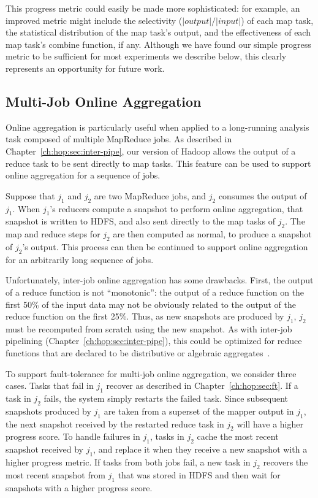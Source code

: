 This progress metric could easily be made more sophisticated: for example, an
improved metric might include the selectivity ($|output|/|input|$) of each map task, the
statistical distribution of the map task's output, and the effectiveness of each
map task's combine function, if any. 
Although we have found our simple progress metric to be
sufficient for most experiments we describe below, this clearly
represents an opportunity for future work.

\subsection{Multi-Job Online Aggregation}
\label{ch:hop:sec:online-multi}

Online aggregation is particularly useful when applied to a long-running
analysis task composed of multiple MapReduce jobs.  As described in
Chapter~\ref{ch:hop:sec:inter-pipe}, our version of Hadoop allows the output of
a reduce task to be sent directly to map tasks.  This feature can be used to
support online aggregation for a sequence of jobs.

Suppose that $j_1$ and $j_2$ are two MapReduce jobs, and $j_2$ consumes the
output of $j_1$.  When $j_1$'s reducers compute a snapshot to perform online
aggregation, that snapshot is written to HDFS, and also sent directly to the
map tasks of $j_2$.  The map and reduce steps for $j_2$ are then computed as
normal, to produce a snapshot of $j_2$'s output.  This process can then be
continued to support online aggregation for an arbitrarily long sequence of
jobs.
  
Unfortunately, inter-job online aggregation has some drawbacks.  First, the
output of a reduce function is not ``monotonic'': the output of a reduce
function on the first 50\% of the input data may not be obviously related to
the output of the reduce function on the first 25\%.  Thus, as new snapshots
are produced by $j_1$, $j_2$ must be recomputed from scratch using the new
snapshot.  As with inter-job pipelining (Chapter~\ref{ch:hop:sec:inter-pipe}),
this could be optimized for reduce functions that are declared to be
distributive or algebraic aggregates~\cite{datacube}.

To support fault-tolerance for multi-job online aggregation, we consider three
cases. Tasks that fail in $j_1$ recover as described in Chapter~\ref{ch:hop:sec:ft}.
If a task in $j_2$ fails, the system simply restarts the failed task. Since
subsequent snapshots produced by $j_1$ are taken from a superset of the mapper
output in $j_1$, the next snapshot received by the restarted reduce task in
$j_2$ will have a higher progress score. To handle failures in $j_1$, tasks in
$j_2$ cache the most recent snapshot received by $j_1$, and replace it when they
receive a new snapshot with a higher progress metric. If tasks from both jobs
fail, a new task in $j_2$ recovers the most recent snapshot from $j_1$ that was
stored in HDFS and then wait for snapshots with a higher progress score.

